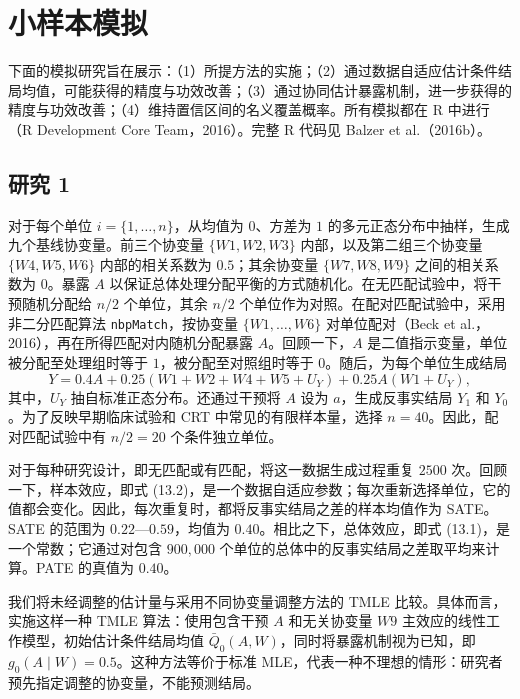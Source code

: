 \section{小样本模拟}
\label{sec:ch13-small-sample-simulations}

下面的模拟研究旨在展示：（1）所提方法的实施；（2）通过数据自适应估计条件结局均值，可能获得的精度与功效改善；（3）通过协同估计暴露机制，进一步获得的精度与功效改善；（4）维持置信区间的名义覆盖概率。所有模拟都在 R 中进行（R Development Core Team，2016）。完整 R 代码见 Balzer et al.（2016b）。

\subsection{研究 1}
\label{subsec:ch13-study1}

对于每个单位 $i=\{1,\ldots,n\}$，从均值为 $0$、方差为 $1$ 的多元正态分布中抽样，生成九个基线协变量。前三个协变量 $\{W1,W2,W3\}$ 内部，以及第二组三个协变量 $\{W4,W5,W6\}$ 内部的相关系数为 $0.5$；其余协变量 $\{W7,W8,W9\}$ 之间的相关系数为 $0$。暴露 $A$ 以保证总体处理分配平衡的方式随机化。在无匹配试验中，将干预随机分配给 $n/2$ 个单位，其余 $n/2$ 个单位作为对照。在配对匹配试验中，采用非二分匹配算法 \texttt{nbpMatch}，按协变量 $\{W1,\ldots,W6\}$ 对单位配对（Beck et al.，2016），再在所得匹配对内随机分配暴露 $A$。回顾一下，$A$ 是二值指示变量，单位被分配至处理组时等于 $1$，被分配至对照组时等于 $0$。随后，为每个单位生成结局
\[
 Y=0.4A+0.25(W1+W2+W4+W5+U_Y)+0.25A(W1+U_Y),
\]
其中，$U_Y$ 抽自标准正态分布。还通过干预将 $A$ 设为 $a$，生成反事实结局 $Y_1$ 和 $Y_0$。为了反映早期临床试验和 CRT 中常见的有限样本量，选择 $n=40$。因此，配对匹配试验中有 $n/2=20$ 个条件独立单位。

对于每种研究设计，即无匹配或有匹配，将这一数据生成过程重复 $2500$ 次。回顾一下，样本效应，即式 (13.2)，是一个数据自适应参数；每次重新选择单位，它的值都会变化。因此，每次重复时，都将反事实结局之差的样本均值作为 SATE。SATE 的范围为 $0.22$—$0.59$，均值为 $0.40$。相比之下，总体效应，即式 (13.1)，是一个常数；它通过对包含 $900{,}000$ 个单位的总体中的反事实结局之差取平均来计算。PATE 的真值为 $0.40$。

我们将未经调整的估计量与采用不同协变量调整方法的 TMLE 比较。具体而言，实施这样一种 TMLE 算法：使用包含干预 $A$ 和无关协变量 $W9$ 主效应的线性工作模型，初始估计条件结局均值 $\bar Q_0(A,W)$，同时将暴露机制视为已知，即 $g_0(A\mid W)=0.5$。这种方法等价于标准 MLE，代表一种不理想的情形：研究者预先指定调整的协变量，不能预测结局。


